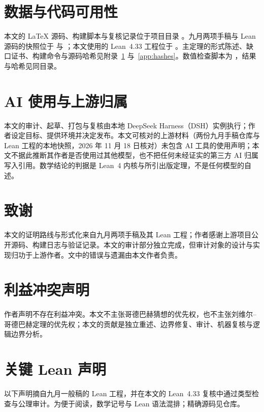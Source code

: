 \documentclass[11pt,a4paper]{ctexart}
\theoremstyle{plain}
\theoremstyle{definition}
\begin{document}
\section*{数据与代码可用性}
\label{sec:data}

{\raggedright
本文的 \LaTeX{} 源码、构建脚本与复核记录位于项目目录 。九月两项手稿与 Lean 源码的快照位于  与 ；本文使用的 Lean~4.33 工程位于 。主定理的形式陈述、缺口证书、构建命令与源码哈希见附录~\ref{app:lean} 与~\ref{app:hashes}。数值检查脚本为 ，结果与哈希见同目录。\par}

\section*{AI 使用与上游归属}

本文的审计、起草、打包与复核由本地 DeepSeek Harness（DSH）实例执行；作者设定目标、提供环境并决定发布。本文可核对的上游材料（两份九月手稿仓库与 Lean 工程的本地快照，2026 年 11 月 18 日核对）未包含 AI 工具的使用声明；本文不据此推断其作者是否使用过其他模型，也不把任何未经证实的第三方 AI 归属写入引用。数学结论的判据是 Lean~4 内核与所引出版定理，不是任何模型的自述。

\section*{致谢}

本文的证明路线与形式化来自九月两项手稿及其 Lean 工程；作者感谢上游项目公开源码、构建日志与验证记录。本文的审计部分独立完成，但审计对象的设计与实现归功于上游作者。文中的错误与遗漏由本文作者负责。

\section*{利益冲突声明}

作者声明不存在利益冲突。本文不主张哥德巴赫猜想的优先权，也不主张刘维尔--哥德巴赫定理的优先权；本文的贡献是独立重述、边界修复、审计、机器复核与逻辑边界分析。

\appendix

\section{关键 Lean 声明}
\label{app:lean}

以下声明摘自九月一般稿的 Lean 工程，并在本文的 Lean~4.33 复核中通过类型检查与公理审计。为便于阅读，数学记号与 Lean 语法混排；精确源码见仓库。
\end{document}
